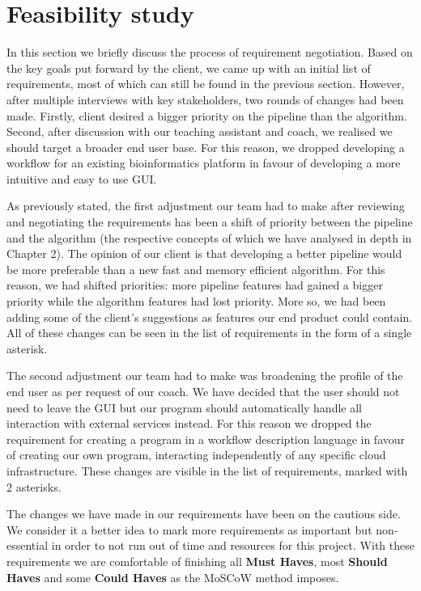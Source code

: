 \documentclass{report}
\begin{document}
\section{Feasibility study}
In this section we briefly discuss the process of requirement negotiation. Based on the key goals put forward by the client, we came up with an initial list of requirements, most of which can still be found in the previous section. However, after multiple interviews with key stakeholders, two rounds of changes had been made. Firstly, client desired a bigger priority on the pipeline than the algorithm. Second, after discussion with our teaching assistant and coach, we realised we should target a broader end user base. For this reason, we dropped developing a workflow for an existing bioinformatics platform in favour of developing a more intuitive and easy to use GUI.

As previously stated, the first adjustment our team had to make after reviewing and negotiating the requirements has been a shift of priority between the pipeline and the algorithm (the respective concepts of which we have analysed in depth in Chapter 2). The opinion of our client is that developing a better pipeline would be more preferable than a new fast and memory efficient algorithm. For this reason, we had shifted priorities: more pipeline features had gained a bigger priority while the algorithm features had lost priority. More so, we had been adding some of the client's suggestions as features our end product could contain. All of these changes can be seen in the list of requirements in the form of a single asterisk.

The second adjustment our team had to make was broadening the profile of the end user as per request of our coach. We have decided that the user should not need to leave the GUI but our program should automatically handle all interaction with external services instead. For this reason we dropped the requirement for creating a program in a workflow description language in favour of creating our own program, interacting independently of any specific cloud infrastructure. These changes are visible in the list of requirements, marked with 2 asterisks.

The changes we have made in our requirements have been on the cautious side. We consider it a better idea to mark more requirements as important but non-essential in order to not run out of time and resources for this project. With these requirements we are comfortable of finishing all \textbf{Must Haves}, most \textbf{Should Haves} and some \textbf{Could Haves} as the MoSCoW method imposes. 
\end{document}
